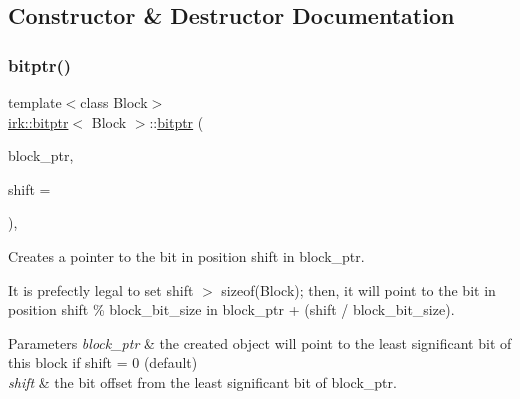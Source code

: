 \subsection{Constructor \& Destructor Documentation}
\mbox{\label{classirk_1_1bitptr_acd28cbb88a0840befdd9bc7a7260f036}} 
\subsubsection{\texorpdfstring{bitptr()}{bitptr()}\hspace{0.1cm}{\footnotesize\ttfamily [1/3]}}
{\footnotesize\ttfamily template$<$class Block$>$ \\
\mbox{\hyperlink{classirk_1_1bitptr}{irk\+::bitptr}}$<$ Block $>$\+::\mbox{\hyperlink{classirk_1_1bitptr}{bitptr}} (\begin{DoxyParamCaption}\item[{Block $\ast$}]{block\+\_\+ptr,  }\item[{std\+::uint8\+\_\+t}]{shift = {} }\end{DoxyParamCaption})\hspace{0.3cm}{\ttfamily [inline]}, {\ttfamily [explicit]}}



Creates a pointer to the bit in position {\ttfamily shift} in {\ttfamily block\+\_\+ptr}. 

It is prefectly legal to set {\ttfamily shift $>$ sizeof(\+Block)}; then, it will point to the bit in position {\ttfamily shift \% block\+\_\+bit\+\_\+size} in {\ttfamily block\+\_\+ptr + (shift / block\+\_\+bit\+\_\+size)}.


\begin{DoxyParams}{Parameters}
{\em block\+\_\+ptr} & the created object will point to the least significant bit of this block if {\ttfamily shift = 0} (default) \\
\hline
{\em shift} & the bit offset from the least significant bit of {\ttfamily block\+\_\+ptr}. \\
\hline
\end{DoxyParams}
\mbox{\label{classirk_1_1bitptr_aa1c908a8d26c9286270ccb73ca5a3d85}} 
